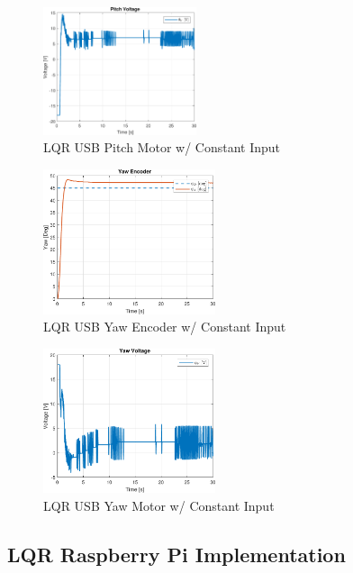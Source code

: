 \documentclass[letterpaper, 10pt, conference]{ieeeconf}
\begin{document}
\begin{figure}
  \centering
  \includegraphics[width=0.4\textwidth]{figs/matlab/LQR/Pitch_Volt_LQR_USB_CON}
  \caption{LQR USB Pitch Motor w/ Constant Input}
  \label{fig:Pitch_Volt_LQR_USB_CON}
\end{figure}

\begin{figure}
  \centering
  \includegraphics[width=0.45\textwidth]{figs/matlab/LQR/Yaw_Pos_LQR_USB_CON}
  \caption{LQR USB Yaw Encoder w/ Constant Input}
  \label{fig:Yaw_Pos_LQR_USB_CON}
\end{figure}

\begin{figure}
  \centering
  \includegraphics[width=0.45\textwidth]{figs/matlab/LQR/Yaw_Volt_LQR_USB_CON}
  \caption{LQR USB Yaw Motor w/ Constant Input}
  \label{fig:Yaw_Volt_LQR_USB_CON}
\end{figure}

\subsection{LQR Raspberry Pi Implementation} \label{sec:LQR_RPi_imp}
\end{document}
